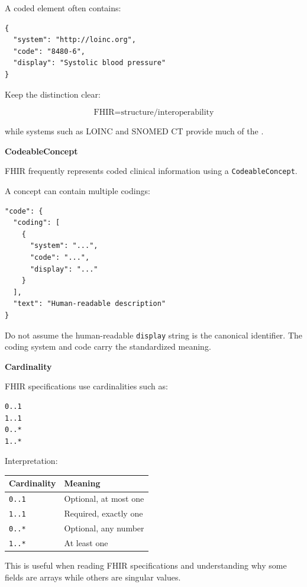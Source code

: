 \documentclass[11pt,letterpaper]{article}
\begin{document}
A coded element often contains:

\begin{lstlisting}
{
  "system": "http://loinc.org",
  "code": "8480-6",
  "display": "Systolic blood pressure"
}
\end{lstlisting}

Keep the distinction clear:

\[
\text{FHIR}
=
\text{structure/interoperability}
\]

while systems such as LOINC and SNOMED CT provide much of the
.

\textbf{CodeableConcept}

FHIR frequently represents coded clinical information using a
\texttt{CodeableConcept}.

A concept can contain multiple codings:

\begin{lstlisting}
"code": {
  "coding": [
    {
      "system": "...",
      "code": "...",
      "display": "..."
    }
  ],
  "text": "Human-readable description"
}
\end{lstlisting}

Do not assume the human-readable \texttt{display} string is the canonical
identifier. The coding system and code carry the standardized meaning.

\textbf{Cardinality}

FHIR specifications use cardinalities such as:

\begin{lstlisting}
0..1
1..1
0..*
1..*
\end{lstlisting}

Interpretation:

\begin{center}
\begin{tabular}{ll}
\toprule
Cardinality & Meaning \\
\midrule
\texttt{0..1} & Optional, at most one \\
\texttt{1..1} & Required, exactly one \\
\texttt{0..*} & Optional, any number \\
\texttt{1..*} & At least one \\
\bottomrule
\end{tabular}
\end{center}

This is useful when reading FHIR specifications and understanding why some
fields are arrays while others are singular values.
\end{document}
